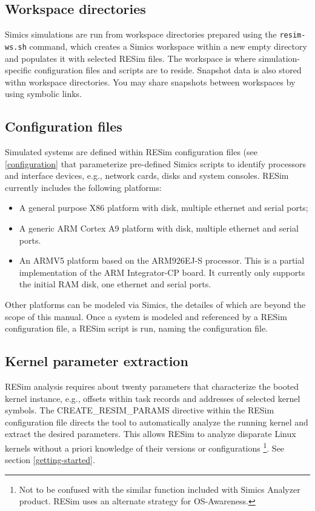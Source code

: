 \documentclass[titlepage]{article}
\begin{document}
\subsection{Workspace directories}
Simics simulations are run from workspace directories prepared using the {\tt resim-ws.sh} command, which creates a Simics workspace within a new empty
directory and populates it with selected RESim files.  The workspace is where simulation-specific configuration files and scripts are to reside.  Snapshot
data is also stored withn workspace directories.  You may share snapshots between workspaces by using symbolic links.  

\subsection{Configuration files}
Simulated systems are defined within RESim configuration files (see \ref{configuration} that  parameterize pre-defined Simics scripts to identify 
processors and interface devices, e.g., network cards, disks and system consoles.  RESim currently includes the following platforms: 
\begin{itemize}
\item A general purpose X86 platform with disk, multiple ethernet and serial ports;
\item A generic ARM Cortex A9 platform with disk, multiple ethernet and serial ports.
\item An ARMV5 platform based on the ARM926EJ-S processor.  This is a partial implementation of the ARM Integrator-CP board.  It currently only supports
the initial RAM disk, one ethernet and serial ports.
\end{itemize}

Other platforms can be modeled via Simics, the detailes of which are beyond the scope of this manual.
Once a system is modeled and referenced by a RESim configuration file, a RESim script is run, naming the configuration file.

\subsection{Kernel parameter extraction}
RESim analysis requires about twenty parameters that characterize the booted kernel instance, e.g., offsets within task 
records and addresses of selected kernel symbols.  The CREATE\_RESIM\_PARAMS directive within the RESim configuration file directs the tool to automatically analyze the running kernel 
and extract the desired parameters.  This allows RESim to analyze disparate Linux kernels without a priori 
knowledge of their versions or configurations \footnote{Not to be confused with the similar function included with Simics Analyzer product. RESim uses an alternate strategy for OS-Awareness.}.
See section \ref{getting-started}.
\end{document}
